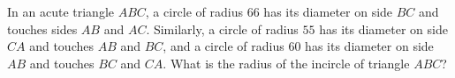 In an acute triangle $ABC$, a circle of radius $66$ has its diameter on side $BC$ and touches sides $AB$ and $AC$. Similarly, a circle of radius $55$ has its diameter on side $CA$ and touches $AB$ and $BC$, and a circle of radius $60$ has its diameter on side $AB$ and touches $BC$ and $CA$. What is the radius of the incircle of triangle $ABC$?

